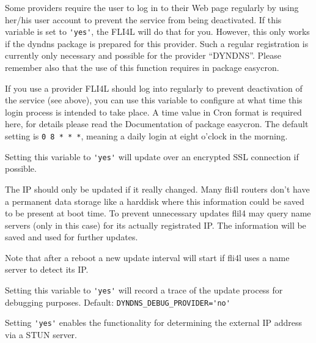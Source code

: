 \begin{description}

Some providers require the user to log in to their Web page regularly 
by using her/his user account to prevent the service from being deactivated. 
If this variable is set to \verb*?'yes'?, the FLI4L will do that for you. 
However, this only works if the dyndns package is prepared for this 
provider. Such a regular registration is currently only necessary and 
possible for the provider ``DYNDNS''. Please remember also that the 
use of this function requires  in package 
easycron.


If you use a provider FLI4L should log into regularly to prevent 
deactivation of the service (see above), you can use this variable 
to configure at what time this login process is intended to take place. A time 
value in Cron format is required here, for details please read the
Documentation of package easycron. The default setting is 
\texttt{0 8 * * *}, meaning a daily login at eight o'clock 
in the morning.


Setting this variable to \verb*?'yes'? will update over an encrypted 
SSL connection if possible.

The IP should only be updated if it really changed. Many fli4l routers don't 
have a permanent data storage like a harddisk where this information 
could be saved to be present at boot time. To prevent unnecessary 
updates flil4 may query name servers (only in this case) for its 
actually registrated IP. The information will be saved and used 
for further updates.

Note that after a reboot a new update interval will start if fli4l 
uses a name server to detect its IP.


Setting this variable to \verb*?'yes'? will record a trace of the update 
process for debugging purposes. 
Default: \verb*?DYNDNS_DEBUG_PROVIDER='no'?


Setting \verb*?'yes'? enables the functionality for determining the external
IP address via a STUN server.


\end{description}
